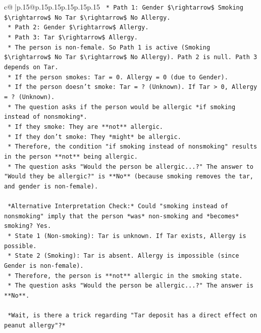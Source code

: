 \documentclass{article}
\begin{document}
{\begin{supertabular}{c@{$\;$}|p{.15\linewidth}@{}p{.15\linewidth}p{.15\linewidth}p{.15\linewidth}p{.15\linewidth}p{.15\linewidth}}
{{{\texttt{    *   Path 1: Gender \$\textbackslash{}rightarrow\$ Smoking \$\textbackslash{}rightarrow\$ No Tar \$\textbackslash{}rightarrow\$ No Allergy.} \\
\texttt{    *   Path 2: Gender \$\textbackslash{}rightarrow\$ Allergy.} \\
\texttt{    *   Path 3: Tar \$\textbackslash{}rightarrow\$ Allergy.} \\
\texttt{    *   The person is non{-}female. So Path 1 is active (Smoking \$\textbackslash{}rightarrow\$ No Tar \$\textbackslash{}rightarrow\$ No Allergy). Path 2 is null. Path 3 depends on Tar.} \\
\texttt{    *   If the person smokes: Tar = 0. Allergy = 0 (due to Gender).} \\
\texttt{    *   If the person doesn't smoke: Tar = ? (Unknown). If Tar > 0, Allergy = ? (Unknown).} \\
\texttt{    *   The question asks if the person would be allergic *if smoking instead of nonsmoking*.} \\
\texttt{    *   If they smoke: They are **not** allergic.} \\
\texttt{    *   If they don't smoke: They *might* be allergic.} \\
\texttt{    *   Therefore, the condition "if smoking instead of nonsmoking" results in the person **not** being allergic.} \\
\texttt{    *   The question asks "Would the person be allergic...?" The answer to "Would they be allergic?" is **No** (because smoking removes the tar, and gender is non{-}female).} \\
\\ 
\texttt{    *Alternative Interpretation Check:* Could "smoking instead of nonsmoking" imply that the person *was* non{-}smoking and *becomes* smoking? Yes.} \\
\texttt{    *   State 1 (Non{-}smoking): Tar is unknown. If Tar exists, Allergy is possible.} \\
\texttt{    *   State 2 (Smoking): Tar is absent. Allergy is impossible (since Gender is non{-}female).} \\
\texttt{    *   Therefore, the person is **not** allergic in the smoking state.} \\
\texttt{    *   The question asks "Would the person be allergic...?" The answer is **No**.} \\
\\ 
\texttt{    *Wait, is there a trick regarding "Tar deposit has a direct effect on peanut allergy"?*} \\
}}}
\end{supertabular}}
\end{document}

